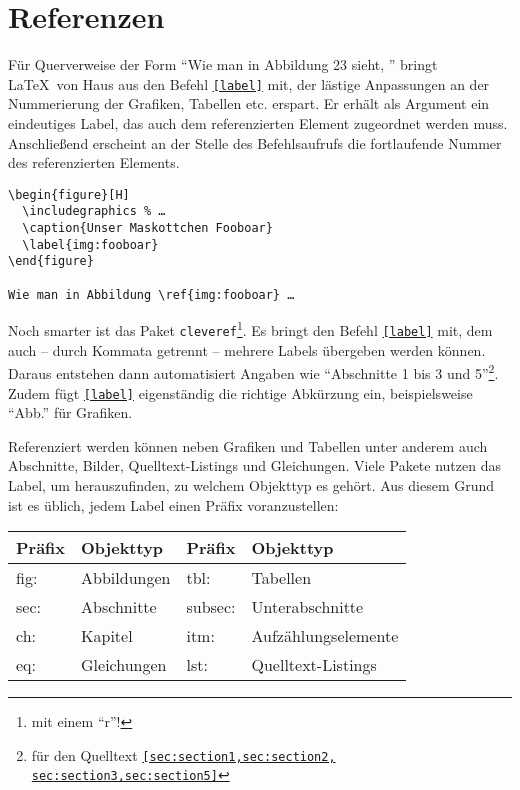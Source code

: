 \section{Referenzen}\label{sec:referenzen}

Für Querverweise der Form \enquote{Wie man in Abbildung 23 sieht, \textellipsis} bringt \LaTeX\ von Haus aus den Befehl \texttt{\ref{label}} mit, der lästige Anpassungen an der Nummerierung der Grafiken, Tabellen etc. erspart.
Er erhält als Argument ein eindeutiges Label, das auch dem referenzierten Element zugeordnet werden muss.
Anschließend erscheint an der Stelle des Befehlsaufrufs die fortlaufende Nummer des referenzierten Elements.

\begin{verbatim}
\begin{figure}[H]
  \includegraphics % …
  \caption{Unser Maskottchen Fooboar}
  \label{img:fooboar}
\end{figure}

Wie man in Abbildung \ref{img:fooboar} …
\end{verbatim}


Noch smarter ist das Paket \texttt{cleveref}\footnote{mit einem \enquote{r}!}.
Es bringt den Befehl \texttt{\cref{label}} mit, dem auch -- durch Kommata getrennt -- mehrere Labels übergeben werden können.
Daraus entstehen dann automatisiert Angaben wie \enquote{Abschnitte 1 bis 3 und 5}\footnote{für den Quelltext \texttt{\cref{sec:section1,sec:section2,
sec:section3,sec:section5}}}.
Zudem fügt \texttt{\cref{label}} eigenständig die richtige Abkürzung ein, beispielsweise \enquote{Abb.} für Grafiken.

Referenziert werden können neben Grafiken und Tabellen unter anderem auch Abschnitte, Bilder, Quelltext-Listings und Gleichungen.
Viele Pakete nutzen das Label, um herauszufinden, zu welchem Objekttyp es gehört.
Aus diesem Grund ist es üblich, jedem Label einen Präfix voranzustellen:

\begin{table}[H]
  \centering
  \begin{tabular}{@{}llll@{}}
    \toprule
    Präfix & Objekttyp & Präfix & Objekttyp \\ \midrule
    fig: & Abbildungen & tbl:    & Tabellen            \\ 
    sec: & Abschnitte  & subsec: & Unterabschnitte     \\
    ch:  & Kapitel     & itm:    & Aufzählungselemente \\
    eq:  & Gleichungen & lst:    & Quelltext-Listings  \\ \bottomrule
  \end{tabular}
\end{table}

